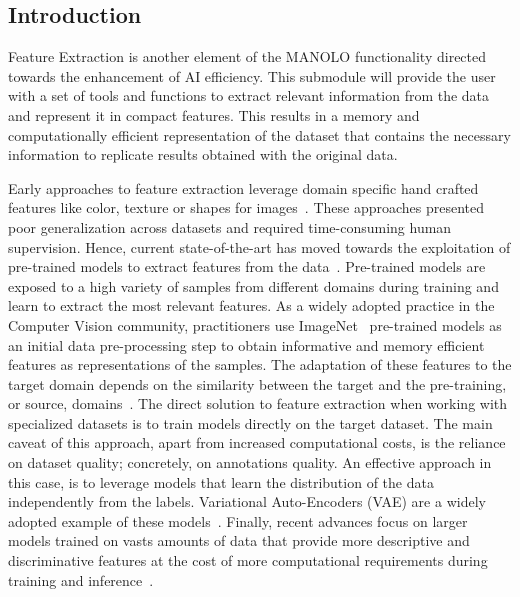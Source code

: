 \subsection{Introduction}\label{subsec:2.3.feat_extr_intro}

Feature Extraction is another element of the MANOLO functionality directed towards the enhancement of AI efficiency. This submodule will provide the user with a set of tools and functions to extract relevant information from the data and represent it in compact features. This results in a memory and computationally efficient representation of the dataset that contains the necessary information to replicate results obtained with the original data. 

Early approaches to feature extraction leverage domain specific hand crafted features like color, texture or shapes for images~\citep{2019_ICSP_featExtrSurv}. These approaches presented poor generalization across datasets and required time-consuming human supervision. Hence, current state-of-the-art has moved towards the exploitation of pre-trained models to extract features from the data~\citep{laion, 2019_CVPR_transferImagenet, 2021_ICML_transferNLP}. Pre-trained models are exposed to a high variety of samples from different domains during training and learn to extract the most relevant features. As a widely adopted practice in the Computer Vision community, practitioners use ImageNet~\citep{imagenet} pre-trained models as an initial data pre-processing step to obtain informative and memory efficient features as representations of the samples. The adaptation of these features to the target domain depends on the similarity between the target and the pre-training, or source, domains~\citep{2018_CVPR_taskonomy}. The direct solution to feature extraction when working with specialized datasets is to train models directly on the target dataset. The main caveat of this approach, apart from increased computational costs, is the reliance on dataset quality; concretely, on annotations quality. An effective approach in this case, is to leverage models that learn the distribution of the data independently from the labels. Variational Auto-Encoders (VAE) are a widely adopted example of these models~\citep{2023_AISTATS_vqvae, 2015_ICLRw_VRAE, 2017_NeurIPS_VQVAE}. Finally, recent advances focus on larger models trained on vasts amounts of data that provide more descriptive and discriminative features at the cost of more computational requirements during training and inference~\citep{2024_Springer_foundation, 2021_ICML_CLIP}.

